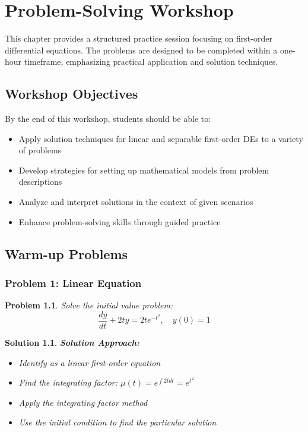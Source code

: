 \documentclass[12pt, letterpaper]{book}
\newcounter{problemcounter}[chapter]
\theoremstyle{problemstyle}
\newtheorem{problem}[problemcounter]{Problem}
\theoremstyle{solutionstyle}
\newtheorem*{solution}{Solution}
\begin{document}
\chapter{Problem-Solving Workshop}
\label{chap:session_4}

This chapter provides a structured practice session focusing on first-order differential equations. The problems are designed to be completed within a one-hour timeframe, emphasizing practical application and solution techniques.

\section{Workshop Objectives}
By the end of this workshop, students should be able to:
\begin{itemize}
    \item Apply solution techniques for linear and separable first-order DEs to a variety of problems
    \item Develop strategies for setting up mathematical models from problem descriptions
    \item Analyze and interpret solutions in the context of given scenarios
    \item Enhance problem-solving skills through guided practice
\end{itemize}

\section{Warm-up Problems}

\subsection{Problem 1: Linear Equation}

\begin{problem}
Solve the initial value problem:
$$\frac{dy}{dt} + 2ty = 2te^{-t^2}, \quad y(0) = 1$$
\end{problem}

\begin{solution}
\textbf{Solution Approach:}
\begin{itemize}
    \item Identify as a linear first-order equation
    \item Find the integrating factor: $\mu(t) = e^{\int 2t dt} = e^{t^2}$
    \item Apply the integrating factor method
    \item Use the initial condition to find the particular solution
\end{itemize}
\end{solution}
\end{document}
